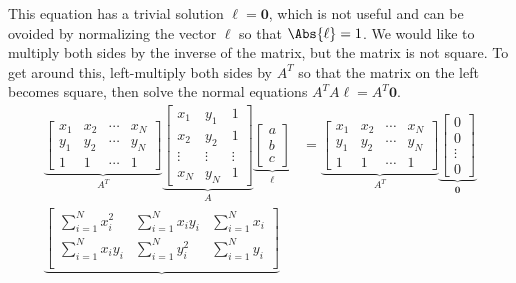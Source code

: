 \begin{problem}
\begin{enumroman}
\begin{answer}
        \step
        This equation has a trivial solution $\ell = \mathbf{0}$,
        which is not useful and can be ovoided by normalizing
        the vector $\ell$ so that $\Abs{\ell} = 1$.
        We would like to multiply both sides by the inverse of the matrix,
        but the matrix is not square.
        To get around this, left-multiply both sides by $A^T$
        so that the matrix on the left becomes square,
        then solve the normal equations $A^T A \ell = A^T \mathbf{0}$.
        \begin{align*}
          \underbrace{\begin{bmatrix}
            x_1 & x_2 & \cdots & x_N \\
            y_1 & y_2 & \cdots & y_N \\
            1 & 1 & \cdots & 1
          \end{bmatrix}}_{A^T}
          \underbrace{\begin{bmatrix}
            x_1 & y_1 & 1 \\
            x_2 & y_2 & 1 \\
            \vdots & \vdots & \vdots \\
            x_N & y_N & 1
          \end{bmatrix}}_{A}
          \underbrace{\begin{bmatrix}
            a \\
            b \\
            c
          \end{bmatrix}}_{\ell}
          &=
          \underbrace{\begin{bmatrix}
            x_1 & x_2 & \cdots & x_N \\
            y_1 & y_2 & \cdots & y_N \\
            1 & 1 & \cdots & 1
          \end{bmatrix}}_{A^T}
          \underbrace{\begin{bmatrix}
            0 \\
            0 \\
            \vdots \\
            0
          \end{bmatrix}}_{\mathbf{0}} \\
          \underbrace{\begin{bmatrix}
            \sum\limits_{i=1}^N x_i^2 & \sum\limits_{i=1}^N x_i y_i & \sum\limits_{i=1}^N x_i \\
            \sum\limits_{i=1}^N x_i y_i & \sum\limits_{i=1}^N y_i^2 & \sum\limits_{i=1}^N y_i \\

\end{bmatrix}}
\end{align*}
\end{answer}
\end{enumroman}
\end{problem}

